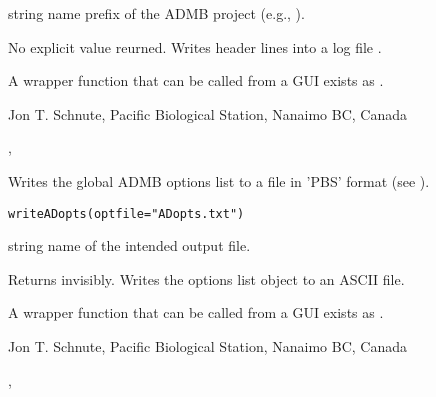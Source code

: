 \documentclass[letterpaper]{book}
\begin{document}
%
\begin{Arguments}
\begin{ldescription}
\item[\code{prefix}] string name prefix of the ADMB project (e.g., ).
\end{ldescription}
\end{Arguments}
%
\begin{Value}
No explicit value reurned. Writes header lines into a log file 
.
\end{Value}
%
\begin{Note}\relax
A wrapper function that can be called from a GUI exists as .
\end{Note}
%
\begin{Author}\relax
 Jon T. Schnute, Pacific Biological Station, Nanaimo BC, Canada 
\end{Author}
%
\begin{SeeAlso}\relax
 ,  
\end{SeeAlso}
%
\begin{Description}\relax
Writes the global ADMB options list to a file in 'PBS' format 
(see ).
\end{Description}
%
\begin{Usage}
\begin{verbatim}
writeADopts(optfile="ADopts.txt")
\end{verbatim}
\end{Usage}
%
\begin{Arguments}
\begin{ldescription}
\item[\code{optfile}] string name of the intended output file.
\end{ldescription}
\end{Arguments}
%
\begin{Value}
Returns  invisibly. Writes the options list object to an ASCII file.
\end{Value}
%
\begin{Note}\relax
A wrapper function that can be called from a GUI exists as .
\end{Note}
%
\begin{Author}\relax
 Jon T. Schnute, Pacific Biological Station, Nanaimo BC, Canada 
\end{Author}
%
\begin{SeeAlso}\relax
 ,  
\end{SeeAlso}
\printindex{}
\end{document}
